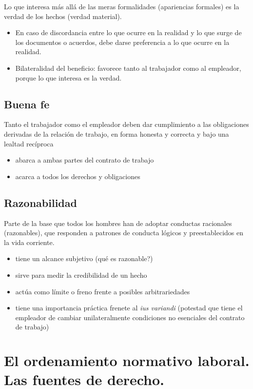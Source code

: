 \documentclass[spanish,12pt,a4paper,titlepage]{report}
\begin{document}
Lo que interesa más allá de las meras formalidades (apariencias formales) es la verdad de los hechos (verdad material). 
\begin{itemize}
\item En caso de discordancia entre lo que ocurre en la realidad y lo que surge de los documentos o acuerdos, debe darse preferencia a lo que ocurre en la realidad.

\item Bilateralidad del beneficio: favorece tanto al trabajador como al empleador, porque lo que interesa es la verdad.
\end{itemize}
\section{Buena fe}
Tanto el trabajador como el empleador deben dar cumplimiento a las obligaciones derivadas de la relación de trabajo, en forma honesta y correcta y bajo una lealtad recíproca
\begin{itemize}
\item abarca a ambas partes del contrato de trabajo
\item acarca a todos los derechos y obligaciones
\end{itemize}
\section{Razonabilidad}

Parte de la base que todos los hombres han de adoptar conductas racionales (razonables), que responden a patrones de conducta  lógicos y preestablecidos en la vida corriente.
\begin{itemize}
\item tiene un alcance subjetivo (qué es razonable?)
\item sirve para medir la credibilidad de un hecho
\item actúa como límite o freno frente a posibles arbitrariedades
\item tiene una importancia práctica frenete al \textit{ius variandi} (potestad que tiene el empleador de cambiar unilateralmente condiciones no esenciales del contrato de trabajo)
\end{itemize}

\chapter{El ordenamiento normativo laboral.   Las fuentes de derecho.}
\end{document}

